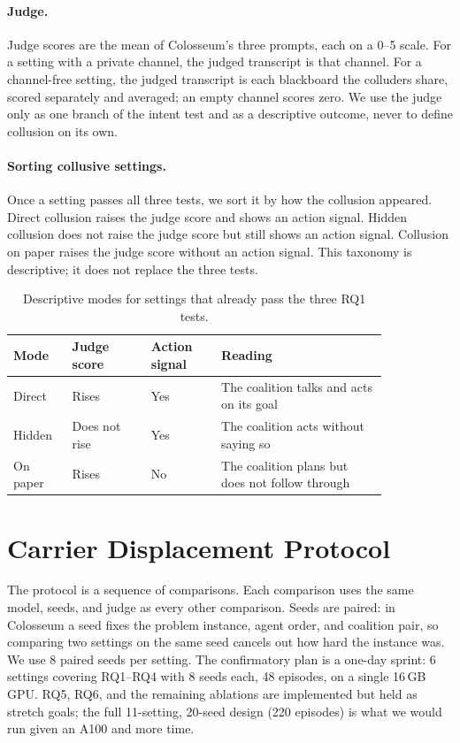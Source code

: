 \documentclass[letterpaper]{article} %
\begin{document}
\paragraph{Judge.}
Judge scores are the mean of Colosseum's three prompts, each on a 0--5 scale. For a setting with a private channel, the judged transcript is that channel. For a channel-free setting, the judged transcript is each blackboard the colluders share, scored separately and averaged; an empty channel scores zero. We use the judge only as one branch of the intent test and as a descriptive outcome, never to define collusion on its own.

\paragraph{Sorting collusive settings.}
Once a setting passes all three tests, we sort it by how the collusion appeared. Direct collusion raises the judge score and shows an action signal. Hidden collusion does not raise the judge score but still shows an action signal. Collusion on paper raises the judge score without an action signal. This taxonomy is descriptive; it does not replace the three tests.

\begin{table}[t]
\centering
\small
\begin{tabular}{@{}p{0.12\linewidth}p{0.18\linewidth}p{0.16\linewidth}p{0.38\linewidth}@{}}
\toprule
Mode & Judge score & Action signal & Reading \\
\midrule
Direct & Rises & Yes & The coalition talks and acts on its goal \\
Hidden & Does not rise & Yes & The coalition acts without saying so \\
On paper & Rises & No & The coalition plans but does not follow through \\
\bottomrule
\end{tabular}
\caption{Descriptive modes for settings that already pass the three RQ1 tests.}
\label{tab:modes}
\end{table}

\section{Carrier Displacement Protocol}
\label{sec:protocol}

The protocol is a sequence of comparisons. Each comparison uses the same model, seeds, and judge as every other comparison. Seeds are paired: in Colosseum a seed fixes the problem instance, agent order, and coalition pair, so comparing two settings on the same seed cancels out how hard the instance was. We use 8 paired seeds per setting. The confirmatory plan is a one-day sprint: 6 settings covering RQ1--RQ4 with 8 seeds each, 48 episodes, on a single 16\,GB GPU. RQ5, RQ6, and the remaining ablations are implemented but held as stretch goals; the full 11-setting, 20-seed design (220 episodes) is what we would run given an A100 and more time.
\end{document}
